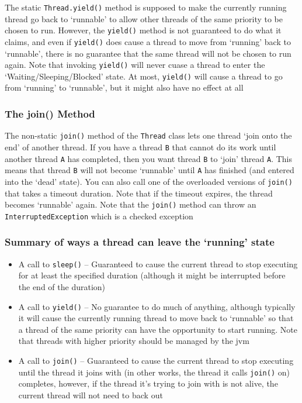 The static \verb#Thread.yield()# method is supposed to make the currently 
running thread go back to `runnable' to allow other threads of the same 
priority to be chosen to run. However, the \verb#yield()# method is not 
guaranteed to do what it claims, and even if \verb#yield()# does cause a thread 
to move from `running' back to `runnable', there is no guarantee that the same 
thread will not be chosen to run again. Note that invoking \verb#yield()# will 
never cuase a thread to enter the `Waiting/Sleeping/Blocked' state. At most, 
\verb#yield()# will cause a thread to go from `running' to `runnable', but it 
might also have no effect at all

\subsubsection{The join() Method}
The non-static \verb#join()# method of the \verb#Thread# class lets one thread 
`join onto the end' of another thread. If you have a thread \verb#B# that 
cannot do its work until another thread \verb#A# has completed, then you want 
thread \verb#B# to `join' thread \verb#A#. This means that thread \verb#B# will 
not become `runnable' until \verb#A# has finished (and entered into the `dead' 
state). You can also call one of the overloaded versions of \verb#join()# that 
takes a timeout duration. Note that if the timeout expires, the thread becomes 
`runnable' again. Note that the \verb#join()# method can throw an 
\verb#InterruptedException# which is a checked exception

\subsubsection{Summary of ways a thread can leave the `running' state}
\begin{itemize}
    \item A call to \verb#sleep()# -- Guaranteed to cause the current thread to 
    stop executing for at least the specified duration (although it might be 
    interrupted before the end of the duration)
    \item A call to \verb#yield()# -- No guarantee to do much of anything, 
    although typically it will cause the currently running thread to move back 
    to `runnable' so that a thread of the same priority can have the 
    opportunity to start running. Note that threads with higher priority should 
    be managed by the jvm
    \item A call to \verb#join()# -- Guaranteed to cause the current thread to 
    stop executing until the thread it joins with (in other works, the thread 
    it calls \verb#join()# on) completes, however, if the thread it's trying to 
    join with is not alive, the current thread will not need to back out
\end{itemize}

